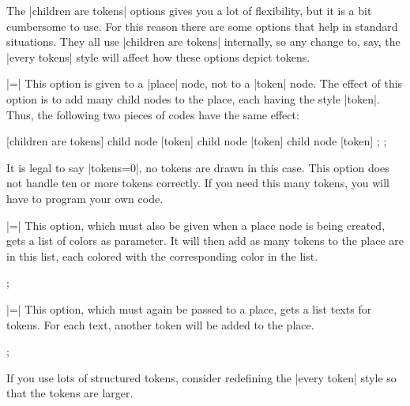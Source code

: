 The |children are tokens| options gives you a lot of flexibility, but
it is a bit cumbersome to use. For this reason there are some options
that help in standard situations. They all use |children are tokens|
internally, so any change to, say, the |every tokens| style will
affect how these options depict tokens.

\begin{itemize}
  |=|
  This option is given to a |place| node, not to a |token| node. The
  effect of this option is to add  many child nodes to
  the place, each having the style |token|. Thus, the following two
  pieces of codes have the same effect:
\begin{codeexample}[]
\tikz
  \node[place] {}
  [children are tokens]
  child {node [token] {}}
  child {node [token] {}}
  child {node [token] {}};
\tikz
  \node[place,tokens=3] {};
\end{codeexample}
  It is legal to say |tokens=0|, no tokens are drawn in this
  case. This option does not handle ten or more tokens correctly. If
  you need this many tokens, you will have to program your own code.
\begin{codeexample}[]
\end{codeexample}
  |=|
  This option, which must also be given when a place node is being
  created, gets a list of colors as parameter. It will then add as
  many tokens to the place are in this list, each colored with the
  corresponding color in the list.
\begin{codeexample}[]
\tikz  \node[place,colored tokens={black,black,red,blue}] {};
\end{codeexample}
  |=|
  This option, which must again be passed to a place, gets a list
  texts for tokens. For each text, another token will be added to the place.
\begin{codeexample}[]
\tikz  \node[place,structured tokens={$x$,$y$,$z$}] {};
\end{codeexample}
\begin{codeexample}[]
\end{codeexample}
  If you use lots of structured tokens, consider redefining the
  |every token| style so that the tokens are larger.
\end{itemize}



